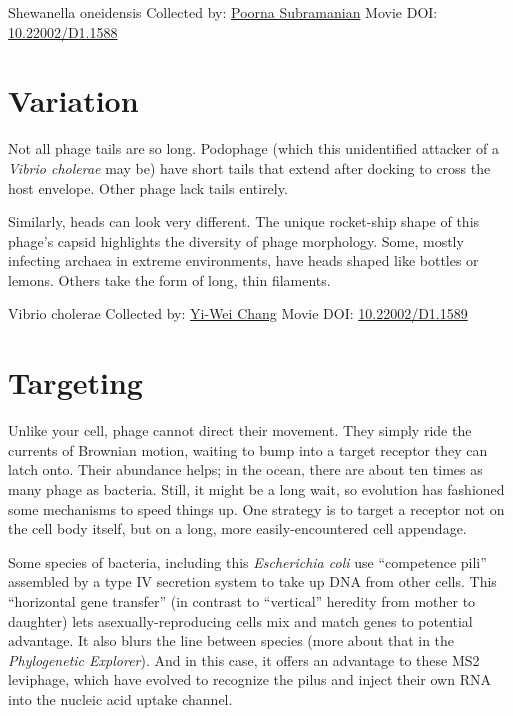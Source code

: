 \documentclass[]{tufte-book}
\begin{document}
\label{fig:10-3}Shewanella oneidensis Collected by: \protect\hyperlink{poorna_subramanian}{Poorna Subramanian} Movie DOI: \href{https://doi.org/10.22002/D1.1588}{10.22002/D1.1588}

\hypertarget{variation-1}{%
\section{Variation}\label{variation-1}}

Not all phage tails are so long. Podophage (which this unidentified attacker of a \emph{Vibrio cholerae} may be) have short tails that extend after docking to cross the host envelope. Other phage lack tails entirely.

Similarly, heads can look very different. The unique rocket-ship shape of this phage's capsid highlights the diversity of phage morphology. Some, mostly infecting archaea in extreme environments, have heads shaped like bottles or lemons. Others take the form of long, thin filaments.



\hypertarget{htmlwidget-08ed1b4b949889bedb99}{}

\label{fig:10-4}Vibrio cholerae Collected by: \protect\hyperlink{yi-wei_chang}{Yi-Wei Chang} Movie DOI: \href{https://doi.org/10.22002/D1.1589}{10.22002/D1.1589}

\hypertarget{targeting}{%
\section{Targeting}\label{targeting}}

Unlike your cell, phage cannot direct their movement. They simply ride the currents of Brownian motion, waiting to bump into a target receptor they can latch onto. Their abundance helps; in the ocean, there are about ten times as many phage as bacteria. Still, it might be a long wait, so evolution has fashioned some mechanisms to speed things up. One strategy is to target a receptor not on the cell body itself, but on a long, more easily-encountered cell appendage.

Some species of bacteria, including this \emph{Escherichia coli} use ``competence pili'' assembled by a type IV secretion system to take up DNA from other cells. This ``horizontal gene transfer'' (in contrast to ``vertical'' heredity from mother to daughter) lets asexually-reproducing cells mix and match genes to potential advantage. It also blurs the line between species (more about that in the \emph{Phylogenetic Explorer}). And in this case, it offers an advantage to these MS2 leviphage, which have evolved to recognize the pilus and inject their own RNA into the nucleic acid uptake channel.
\end{document}
